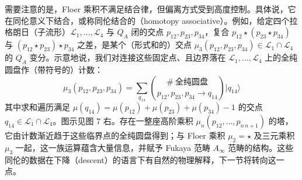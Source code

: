 需要注意的是，Floer 乘积不满足结合律，但偏离方式受到高度控制。具体说，它在同伦意义下结合，或称同伦结合的（homotopy associative）。例如，给定四个拉格朗日（子流形）$\mathcal{L}_1,\ldots,\mathcal{L}_4$ 与 $Q_A$ 闭的交点 $p_{12},p_{23},p_{34}$，复合 $p_{12}\star(p_{23}\star p_{34})$ 与 $(p_{12}\star p_{23})\star p_{34}$ 之差，是某个（形式和的）交点 $\mu_3(p_{12},p_{23},p_{34})\in\mathcal{L}_1\cap\mathcal{L}_4$ 的 $Q_A$ 变分。示意地说，我们对连接这些固定点、且边界落在 $\mathcal{L}_1,\ldots,\mathcal{L}_4$ 上的全纯圆盘作（带符号的）计数：
\begin{equation}\tag{2.54}
\mu_3(p_{12},p_{23},p_{34}) = \sum_{q_{14}}
\binom{\#\ \text{全纯圆盘}}{p_{12},p_{23},p_{34}\to q_{14}}|q_{14}\rangle
\end{equation}
其中求和遍历满足 $\mu(q_{14})=\mu(p_{12})+\mu(p_{23})+\mu(p_{34})-1$ 的交点 $q_{14}\in\mathcal{L}_1\cap\mathcal{L}_4$。图示见图 7 右。存在一整座高阶乘积 $\mu_n(p_{12},\ldots,p_{n\,n+1})$ 的塔，它由计数渐近趋于这些临界点的全纯圆盘得到；与 Floer 乘积 $\mu_2=\star$ 及三元乘积 $\mu_3$ 一起，这一族运算蕴含大量信息，并赋予 Fukaya 范畴 $A_\infty$ 范畴的结构。这些同伦的数据在下降（descent）的语言下有自然的物理解释，下一节将转向这一点。
